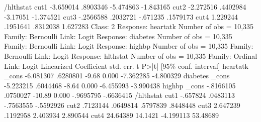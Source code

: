 /hlthstat    {\VBAR}
        cut1 {\VBAR}  -3.659014   .8903346                     -5.474863   -1.843165
        cut2 {\VBAR}  -2.272516   .4402984                      -3.17051   -1.374521
        cut3 {\VBAR}  -.2566588   .2032721                      -.671235    .1579173
        cut4 {\VBAR}   1.229244   .1951641                      .8312038    1.627283
{\smallskip}
Class:    2        
{\smallskip}
Response: heartatk                                      Number of obs = 10,335
Family:   Bernoulli
Link:     Logit    
{\smallskip}
Response: diabetes                                      Number of obs = 10,335
Family:   Bernoulli
Link:     Logit    
{\smallskip}
Response: highbp                                        Number of obs = 10,335
Family:   Bernoulli
Link:     Logit    
{\smallskip}
Response: hlthstat                                      Number of obs = 10,335
Family:   Ordinal  
Link:     Logit    
{\smallskip}
             {\VBAR}             Linearized
             {\VBAR} Coefficient  std. err.      t    P>|t|     [95\% conf. interval]
heartatk     {\VBAR}
       _cons {\VBAR}  -6.081307   .6280801    -9.68   0.000    -7.362285   -4.800329
diabetes     {\VBAR}
       _cons {\VBAR}  -5.223215   .6044468    -8.64   0.000    -6.455993   -3.990438
highbp       {\VBAR}
       _cons {\VBAR}  -.8166105   .0750027   -10.89   0.000    -.9695795   -.6636415
/hlthstat    {\VBAR}
        cut1 {\VBAR}   -.657824   .0483113                     -.7563555   -.5592926
        cut2 {\VBAR}   .7123144   .0649814                      .5797839    .8448448
        cut3 {\VBAR}   2.647239   .1192958                      2.403934    2.890544
        cut4 {\VBAR}   24.64389    14.1421                     -4.199113    53.48689
